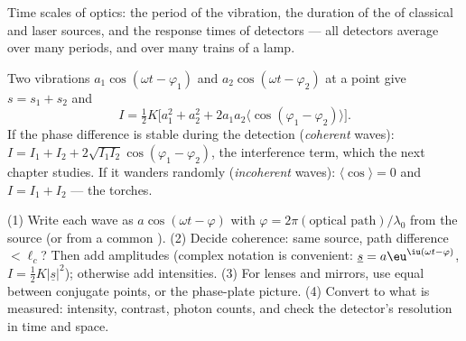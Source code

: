 \begin{omfigure}

{\small Time scales of optics: the period of the vibration, the
duration of the  of classical and laser sources, and the
response times of detectors --- all detectors average over many
periods, and over many trains of a lamp.}
\end{omfigure}

\begin{remark}\label{rem:b2:scalar-light-model:superposition}
Two vibrations $a_1\cos(\omega t - \varphi_1)$ and $a_2\cos(\omega t - \varphi_2)$ at a
point give $s = s_1 + s_2$ and
\[
I = \tfrac12K\bigl[a_1^2 + a_2^2 + 2a_1a_2\langle\cos(\varphi_1 - \varphi_2)\rangle\bigr] .
\]
If the phase difference is stable during the detection
(\emph{coherent} waves): $I = I_1 + I_2 + 2\sqrt{I_1I_2}\cos(\varphi_1 - \varphi_2)$,
the interference term, which the next chapter studies. If it wanders
randomly (\emph{incoherent} waves): $\langle\cos\rangle = 0$ and $I = I_1 +
I_2$ --- the torches.
\end{remark}

\begin{method}\label{met:b2:scalar-light-model:method}
(1) Write each wave as $a\cos(\omega t - \varphi)$ with $\varphi = 2\pi(\text{optical
path})/\lambda_0$ from the source (or from a common ). (2) Decide
coherence: same source, path difference $< \ell_c$? Then add amplitudes
(complex notation is convenient: $\underline s = a\eu^{\iu(\omega t - \varphi)}$, $I =
\tfrac12K|\underline s|^2$); otherwise add intensities. (3) For lenses and
mirrors, use equal  between conjugate points, or the
phase-plate picture. (4) Convert to what is measured: intensity,
contrast, photon counts, and check the detector's resolution in time
and space.
\end{method}

